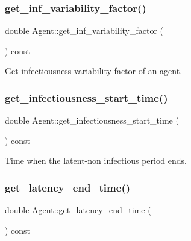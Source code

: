 \subsubsection{\texorpdfstring{get\+\_\+inf\+\_\+variability\+\_\+factor()}{get\_inf\_variability\_factor()}}
{\footnotesize\ttfamily double Agent\+::get\+\_\+inf\+\_\+variability\+\_\+factor (\begin{DoxyParamCaption}{ }\end{DoxyParamCaption}) const\hspace{0.3cm}{\ttfamily [inline]}}



Get infectiousness variability factor of an agent. 

\mbox{\label{classAgent_a5ca1201f213cfa77612b9ab63dbdf977}} 
\subsubsection{\texorpdfstring{get\+\_\+infectiousness\+\_\+start\+\_\+time()}{get\_infectiousness\_start\_time()}}
{\footnotesize\ttfamily double Agent\+::get\+\_\+infectiousness\+\_\+start\+\_\+time (\begin{DoxyParamCaption}{ }\end{DoxyParamCaption}) const\hspace{0.3cm}{\ttfamily [inline]}}



Time when the latent-\/non infectious period ends. 

\mbox{\label{classAgent_a9e29f6f7aeea13a45c2161ebc208d263}} 
\subsubsection{\texorpdfstring{get\+\_\+latency\+\_\+end\+\_\+time()}{get\_latency\_end\_time()}}
{\footnotesize\ttfamily double Agent\+::get\+\_\+latency\+\_\+end\+\_\+time (\begin{DoxyParamCaption}{ }\end{DoxyParamCaption}) const\hspace{0.3cm}{\ttfamily [inline]}}



